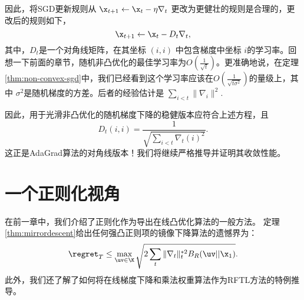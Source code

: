 因此，将SGD更新规则从 $\x_{t+1} \leftarrow \x_t - \eta \nabla_t$ 更改为更健壮的规则是合理的，更改后的规则如下，
$$ \x_{t+1} \leftarrow \x_t - D_t \nabla_t , $$
其中，$D_t$是一个对角线矩阵，在其坐标 $(i,i)$ 中包含梯度中坐标 $i$的学习率。回想一下前面的章节，随机非凸优化的最佳学习率为$O(\frac{1}{\sqrt{t}})$。更准确地说，在定理 \ref{thm:non-convex-sgd}中，我们已经看到这个学习率应该在$O(\frac{1}{\sqrt{t \sigma^2}})$的量级上，其中 $\sigma^2$是随机梯度的方差。后者的经验估计是
$\sum_{i < t} \|\nabla_i\|^2 $. 

因此，用于光滑非凸优化的随机梯度下降的稳健版本应符合上述方程，且
$$ D_t(i,i) = \frac{1}{\sqrt{\sum_{i < t} \nabla_t(i)^2}} .$$
这正是AdaGrad算法的对角线版本！我们将继续严格推导并证明其收敛性能。

\section{
    一个正则化视角
    } 

在前一章中，我们介绍了正则化作为导出在线凸优化算法的一般方法。
定理\ref{thm:mirrordescent}给出任何强凸正则项的镜像下降算法的遗憾界为：
$$ \regret_T \leq  \max_{\uv \in \K} \sqrt{ 2 \sum_t \|\nabla_t \|_t^{* 2}  B_{R}( \uv||\x_1) }. $$
此外，我们还了解了如何将在线梯度下降和乘法权重算法作为RFTL方法的特例推导。

